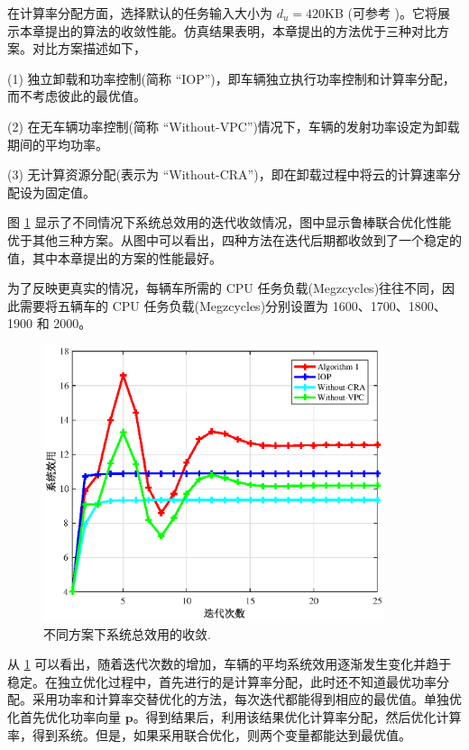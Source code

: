在计算率分配方面，选择默认的任务输入大小为 $d_u=420$KB (可参考 \cite{Xu2015})。它将展示本章提出的算法的收敛性能。仿真结果表明，本章提出的方法优于三种对比方案。对比方案描述如下，

(1) 独立卸载和功率控制(简称 “IOP”)，即车辆独立执行功率控制和计算率分配，而不考虑彼此的最优值。

(2) 在无车辆功率控制(简称 “Without-VPC”)情况下，车辆的发射功率设定为卸载期间的平均功率。

(3) 无计算资源分配(表示为 “Without-CRA”)，即在卸载过程中将云的计算速率分配设为固定值。

图 \ref{F7} 显示了不同情况下系统总效用的迭代收敛情况，图中显示鲁棒联合优化性能优于其他三种方案。从图中可以看出，四种方法在迭代后期都收敛到了一个稳定的值，其中本章提出的方案的性能最好。

为了反映更真实的情况，每辆车所需的 CPU 任务负载(Megzcycles)往往不同，因此需要将五辆车的 CPU 任务负载(Megzcycles)分别设置为 1600、1700、1800、1900 和 2000。
\begin{figure}[H]
\centering
\includegraphics[width=10cm]{figures//chap3//compare.eps}
\caption{不同方案下系统总效用的收敛.}
\label{F7}
\end{figure}

从 \ref{F7} 可以看出，随着迭代次数的增加，车辆的平均系统效用逐渐发生变化并趋于稳定。在独立优化过程中，首先进行的是计算率分配，此时还不知道最优功率分配。采用功率和计算率交替优化的方法，每次迭代都能得到相应的最优值。单独优化首先优化功率向量 $\mathbf{p}$。得到结果后，利用该结果优化计算率分配，然后优化计算率，得到系统。但是，如果采用联合优化，则两个变量都能达到最优值。

